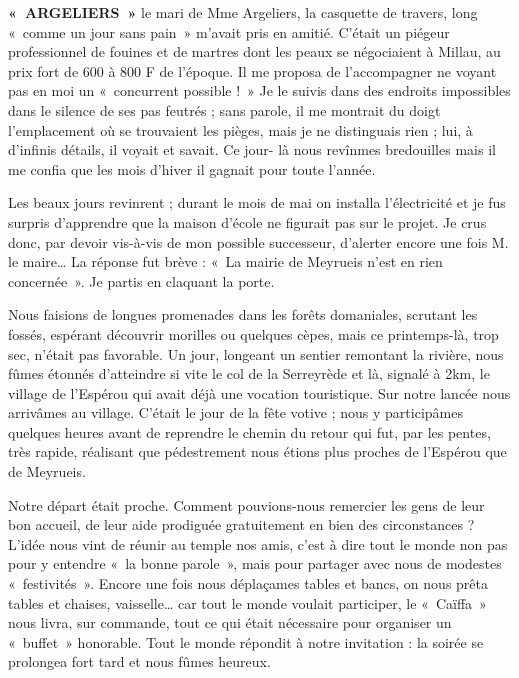 \textbf{«~ARGELIERS~»} le mari de Mme Argeliers, la casquette de travers, long «~comme
un jour sans pain~» m’avait pris en amitié. C’était un piégeur professionnel de fouines
et de martres dont les peaux se négociaient à Millau, au prix fort de 600 à 800 F de
l’époque. Il me proposa de l’accompagner ne voyant pas en moi un «~concurrent
possible !~» Je le suivis dans des endroits impossibles dans le silence de ses pas
feutrés ; sans parole, il me montrait du doigt l’emplacement où se trouvaient les
pièges, mais je ne distinguais rien ; lui, à d’infinis détails, il voyait et savait. Ce jour-
là nous revînmes bredouilles mais il me confia que les mois d’hiver il gagnait pour
toute l’année.

Les beaux jours revinrent ; durant le mois de mai on installa l’électricité et je fus
surpris d’apprendre que la maison d’école ne figurait pas sur le projet. Je crus donc,
par devoir vis-à-vis de mon possible successeur, d’alerter encore une fois M. le
maire… La réponse fut brève : «~La mairie de Meyrueis n’est en rien concernée~». Je
partis en claquant la porte.



Nous faisions de longues promenades dans les forêts domaniales, scrutant les fossés,
espérant découvrir morilles ou quelques cèpes, mais ce printemps-là, trop sec, n’était
pas favorable. Un jour, longeant un sentier remontant la rivière, nous fûmes étonnés
d’atteindre si vite le col de la Serreyrède et là, signalé à 2km, le village de l’Espérou
qui avait déjà une vocation touristique. Sur notre lancée nous arrivâmes au village.
C’était le jour de la fête votive ; nous y participâmes quelques heures avant de
reprendre le chemin du retour qui fut, par les pentes, très rapide, réalisant que
pédestrement nous étions plus proches de l’Espérou que de Meyrueis.


Notre départ était proche. Comment pouvions-nous remercier les gens de leur bon
accueil, de leur aide prodiguée gratuitement en bien des circonstances ?
L’idée nous vint de réunir au temple nos amis, c’est à dire tout le monde non pas pour
y entendre «~la bonne parole~», mais pour partager avec nous de modestes
«~festivités~». Encore une fois nous déplaçames tables et bancs, on nous prêta tables et
chaises, vaisselle… car tout le monde voulait participer, le «~Caïffa~» nous livra, sur
commande, tout ce qui était nécessaire pour organiser un «~buffet~» honorable. Tout le
monde répondit à notre invitation : la soirée se prolongea fort tard et nous fûmes
heureux.

